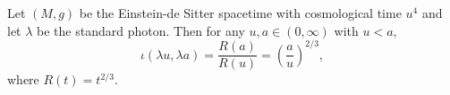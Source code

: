Let $(M, g)$ be the Einstein-de Sitter spacetime with cosmological time $u^4$ and let $\lambda$ be the standard photon. Then for any $u, a \in (0, \infty)$ with $u < a$,
$$\iota(\lambda u, \lambda a) = \frac{R(a)}{R(u)} = \left( \frac{a}{u} \right)^{2/3},$$
where $R(t) = t^{2/3}$.

